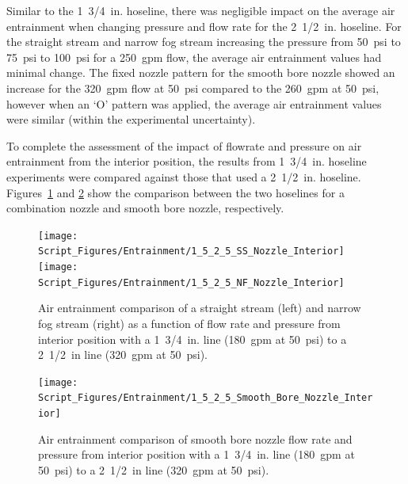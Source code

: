 \documentclass[12pt,oneside]{book}
\begin{document}
Similar to the 1~3/4~in. hoseline, there was negligible impact on the average air entrainment when changing pressure and flow rate for the 2~1/2~in. hoseline. For the straight stream and narrow fog stream increasing the pressure from 50~psi to 75~psi to 100~psi for a 250~gpm flow, the average air entrainment values had minimal change. The fixed nozzle pattern for the smooth bore nozzle showed an increase for the 320~gpm flow at 50~psi compared to the 260~gpm at 50~psi, however when an `O' pattern was applied, the average air entrainment values were similar (within the experimental uncertainty).

To complete the assessment of the impact of flowrate and pressure on air entrainment from the interior position, the results from 1~3/4~in. hoseline experiments were compared against those that used a 2~1/2~in. hoseline. Figures~\ref{fig:SS_NF_1_5_2_5_Int} and \ref{fig:SB_1_5_2_5_Int} show the comparison between the two hoselines for a combination nozzle and smooth bore nozzle, respectively.

\begin{figure}[!ht]
\centering
\texttt{[image: Script\_Figures/Entrainment/1\_5\_2\_5\_SS\_Nozzle\_Interior]}
\texttt{[image: Script\_Figures/Entrainment/1\_5\_2\_5\_NF\_Nozzle\_Interior]}
\caption[Air Entrainment Comparison of Interior Smooth Bore Nozzle from 1~3/4~in Line to 2~1/2~in. Line]{Air entrainment comparison of a straight stream (left) and narrow fog stream (right) as a function of flow rate and pressure from interior position with a 1~3/4~in. line (180~gpm at 50~psi) to a 2~1/2~in line (320~gpm at 50~psi).}
\label{fig:SS_NF_1_5_2_5_Int}
\end{figure}

\begin{figure}[!ht]
\centering
\texttt{[image: Script\_Figures/Entrainment/1\_5\_2\_5\_Smooth\_Bore\_Nozzle\_Interior]}
\caption[Air Entrainment Comparison of Interior Smooth Bore Nozzle from 1~3/4~in Line to 2~1/2~in. Line]{Air entrainment comparison of smooth bore nozzle flow rate and pressure from interior position with a 1~3/4~in. line (180~gpm at 50~psi) to a 2~1/2~in line (320~gpm at 50~psi).}
\label{fig:SB_1_5_2_5_Int}
\end{figure}
\end{document}
